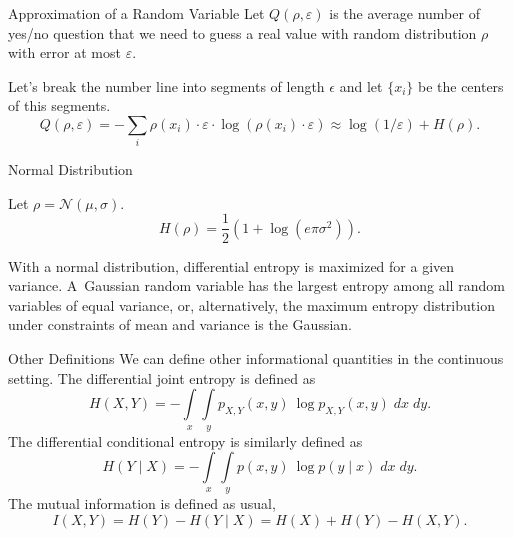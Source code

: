 \documentclass[
aspectratio=169]{beamer}
\begin{document}
\begin{frame}[fragile]{Approximation of a Random Variable}
    Let $Q(\rho, \varepsilon)$ is the average number of yes/no question that
    we need to guess a real value with random distribution $\rho$ with error at most $\varepsilon$.

    Let's break the number line into segments of length $\epsilon$ and let $\{x_i\}$ be the centers of this segments.
    \[
    Q(\rho, \varepsilon) = -\sum_i \rho(x_i)\cdot\varepsilon\cdot\log(\rho(x_i)\cdot\varepsilon) \approx \log(1/\varepsilon) + H(\rho).
    \]
\end{frame}


\begin{frame}{Normal Distribution}
    \begin{theorem}
        Let $\rho = \mathcal{N}(\mu,\sigma)$.
        \[
        H(\rho) = \frac{1}{2}(1+\log(e\pi\sigma^2)).
        \]
    \end{theorem}


    \begin{theorem}
        With a normal distribution, differential entropy is maximized for a given variance. A~Gaussian random variable has the largest entropy among all random variables of equal variance, or, alternatively, the maximum entropy distribution under constraints of mean and variance is the Gaussian.
    \end{theorem}

\end{frame}

\begin{frame}{Other Definitions}
  We can define other informational quantities in the continuous setting.
  The differential joint entropy is defined as
  \[
  H(X, Y) = - \int\limits_x\int\limits_y p_{X, Y}(x, y) \ \log p_{X, Y}(x, y) \;dx \;dy.
  \]
  The differential conditional entropy is similarly defined as
  \[
  H(Y \mid X) = - \int\limits_x \int\limits_y p(x, y) \ \log p(y \mid x) \;dx \;dy.
  \]
  The mutual information is defined as usual,
  \[
  I(X,Y) = H(Y) - H(Y \mid X) = H(X) + H(Y) - H(X,Y).
  \]

\end{frame}
\end{document}
